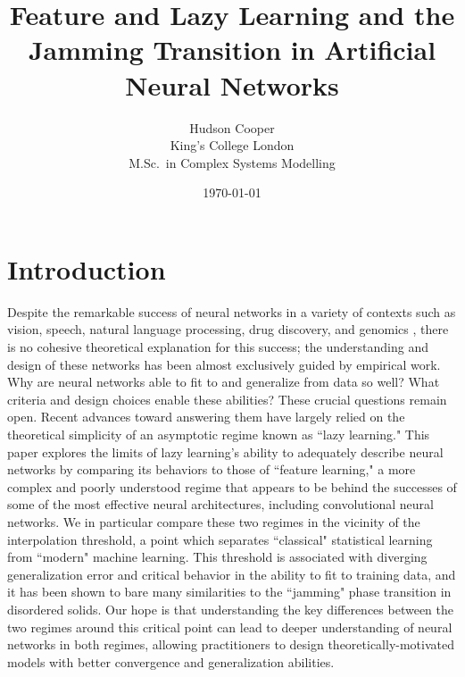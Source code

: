 \documentclass[11pt]{article}
\begin{document}
\title{\bf Feature and Lazy Learning and the Jamming Transition in Artificial Neural Networks}
\author{
    Hudson Cooper\\ %
    King's College London\\
    M.Sc.\ in Complex Systems Modelling
}
\date{\today}

\begin{titlingpage}
\maketitle
\begin{abstract}
\end{abstract}
\end{titlingpage}

\tableofcontents

\section{Introduction}
Despite the remarkable success of neural networks in a variety of contexts such as vision, speech, natural language processing, drug discovery, and genomics \cite{lecunDeepLearning2015}, there is no cohesive theoretical explanation for this success; the understanding and design of these networks has been almost exclusively guided by empirical work. \\

Why are neural networks able to fit to and generalize from data so well? What criteria and design choices enable these abilities? These crucial questions remain open. Recent advances toward answering them have largely relied on the theoretical simplicity of an asymptotic regime known as ``lazy learning." This paper explores the limits of lazy learning's ability to adequately describe neural networks by comparing its behaviors to those of ``feature learning," a more complex and poorly understood regime that appears to be behind the successes of some of the most effective neural architectures, including convolutional neural networks. We in particular compare these two regimes in the vicinity of the interpolation threshold, a point which separates ``classical" statistical learning from ``modern" machine learning. This threshold is associated with diverging generalization error and critical behavior in the ability to fit to training data, and it has been shown to bare many similarities to the ``jamming" phase transition in disordered solids. Our hope is that understanding the key differences between the two regimes around this critical point can lead to deeper understanding of neural networks in both regimes, allowing practitioners to design theoretically-motivated models with better convergence and generalization abilities.\\
\end{document}
